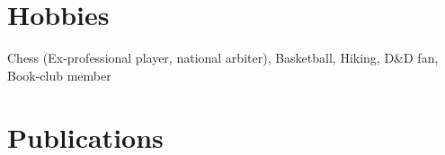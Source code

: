 \documentclass[letterpaper,11pt]{article}
\begin{document}

\section{Hobbies}
  \resumeSubHeadingListStart
    \small{\item{Chess (Ex-professional player, national arbiter), Basketball, Hiking, D\&D fan, Book-club member}}
  \resumeSubHeadingListEnd





\section{Publications}
\vspace{0.2cm}
\nocite{*}
\printbibliography

\end{document}
